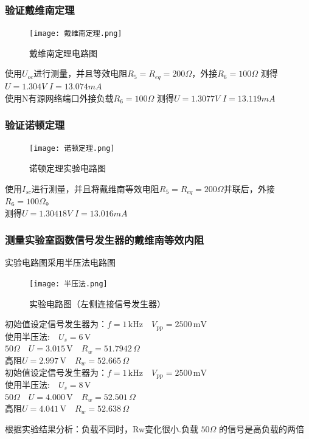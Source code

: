 \documentclass[dvipsnames, svgnames,a4paper,11pt]{article}
\begin{document}
	\subsubsection{验证戴维南定理} 
\begin{figure}[{H}]
	\centering
	\texttt{[image: 戴维南定理.png]}
	\caption{戴维南定理电路图}
	\label{}
\end{figure}
使用$U_{oc}$进行测量，并且等效电阻$R_5=R_{eq}=200\Omega$，外接$R_6=100\Omega$
 测得$U=1.304V $   $I=13.074mA$\\
 \indent 使用N有源网络端口外接负载$R_6=100\Omega$
 测得$U=1.3077V$   $ I=13.119mA$
 \subsubsection{验证诺顿定理}
 \begin{figure}[{H}]
	\centering
	\texttt{[image: 诺顿定理.png]}
	\caption{诺顿定理实验电路图}
	\label{}
 \end{figure}
 使用$I_{sc}$进行测量，并且将戴维南等效电阻$R_5=R_{eq}=200\Omega$并联后，外接$R_6=100\Omega$。\\
\indent 测得$U=1.30418V$   $ I=13.016mA$
\subsubsection{测量实验室函数信号发生器的戴维南等效内阻}
 实验电路图采用半压法电路图
 \begin{figure}[{H}]
	\centering
	\texttt{[image: 半压法.png]}
	\caption{实验电路图（左侧连接信号发生器）}
	\label{}
 \end{figure}
 初始值设定信号发生器为：$f = 1\, \text{kHz} \quad V_{\text{pp}} = 2500\, \text{mV} $\\
 \indent $\text{使用半压法:} \quad U_s = 6\, \text{V} $\\
 \indent $50\Omega \quad U = 3.015\, \text{V} \quad R_w = 51.7942\, \Omega $\\
 \indent 高阻$ U = 2.997\, \text{V} \quad R_w = 52.665\, \Omega$\\
 \indent 初始值设定信号发生器为：$f = 1\, \text{kHz} \quad V_{\text{pp}} = 2500\, \text{mV} $\\
 \indent $\text{使用半压法:} \quad U_s = 8\, \text{V} $\\
 \indent $50\Omega \quad U = 4.000\, \text{V} \quad R_w = 52.501\, \Omega $\\
 \indent 高阻$ U = 4.041\, \text{V} \quad R_w = 52.638\, \Omega$

 根据实验结果分析：负载不同时，Rw变化很小.负载 $50\Omega$ 的信号是高负载的两倍
 
\end{document}
